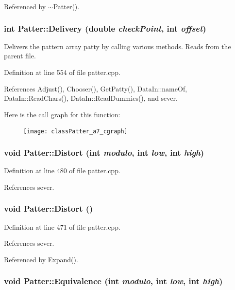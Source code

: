 Referenced by $\sim$Patter().
\subsubsection{\setlength{\rightskip}{0pt plus 5cm}int Patter::Delivery (double {\em check\-Point}, int {\em offset})}\label{classPatter_a7}


Delivers the pattern array patty by calling various methods. Reads from the parent file. 

Definition at line 554 of file patter.cpp.

References Adjust(), Chooser(), Get\-Patty(), Data\-In::name\-Of, Data\-In::Read\-Chars(), Data\-In::Read\-Dummies(), and sever.

Here is the call graph for this function:\begin{figure}[H]
\begin{center}
\leavevmode
\texttt{[image: classPatter\_a7\_cgraph]}
\end{center}
\end{figure}
\subsubsection{\setlength{\rightskip}{0pt plus 5cm}void Patter::Distort (int {\em modulo}, int {\em low}, int {\em high})\hspace{0.3cm}{\tt  [private]}}\label{classPatter_d11}




Definition at line 480 of file patter.cpp.

References sever.
\subsubsection{\setlength{\rightskip}{0pt plus 5cm}void Patter::Distort ()\hspace{0.3cm}{\tt  [private]}}\label{classPatter_d10}




Definition at line 471 of file patter.cpp.

References sever.

Referenced by Expand().
\subsubsection{\setlength{\rightskip}{0pt plus 5cm}void Patter::Equivalence (int {\em modulo}, int {\em low}, int {\em high})\hspace{0.3cm}{\tt  [private]}}\label{classPatter_d7}




